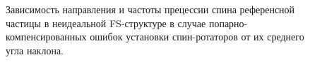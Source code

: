 \begin{figure}[H]
	\centering
\end{figure}
\begin{figure}[H]\centering
	\caption{Зависимость направления и частоты прецессии спина референсной частицы в неидеальной FS-структуре в случае попарно-компенсированных ошибок установки спин-ротаторов от их среднего угла наклона.\label{fig:Linearity_test_compensated}}
\end{figure}




